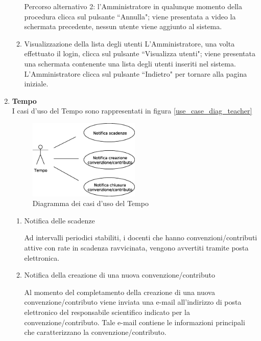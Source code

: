 \begin{enumerate}
\begin{enumerate}
 Percorso alternativo 2:
 l'Amministratore in qualunque momento della procedura clicca sul pulsante ``Annulla"; viene presentata a video la schermata precedente,
 nessun utente viene aggiunto al sistema.
 
 \item Visualizzazione della lista degli utenti \label{UC_view_user_list}
  L'Amministratore, una volta effettuato il login, clicca sul pulsante ``Visualizza utenti"; viene presentata una schermata contenente una lista  degli
  utenti inseriti nel sistema. L'Amministratore clicca sul pulsante ``Indietro" per tornare alla pagina iniziale.
\end{enumerate}

\item \textbf{Tempo}\\
I casi d'uso del Tempo sono rappresentati in figura \ref{use_case_diag_teacher}
\begin{figure}[h]
  \caption{Diagramma dei casi d'uso del Tempo}
  \label{use_case_diag_time}
  \centering
\includegraphics[width = 0.5\textwidth]{images/casi_uso_tempo.eps}
\end{figure}
\begin{enumerate}
 \item Notifica delle scadenze\\ \label{UC_notify_deadlines}
 
    Ad intervalli periodici stabiliti, i docenti che hanno convenzioni/contributi attive con rate in scadenza ravvicinata, vengono avvertiti tramite posta elettronica.
  
 
 \item Notifica della creazione di una nuova convenzione/contributo\\ \label{UC_notify_new_contract}
 
    Al momento del completamento della creazione di una nuova convenzione/contributo viene inviata una e-mail all'indirizzo di posta elettronico del responsabile scientifico indicato per la convenzione/contributo. Tale e-mail contiene
    le informazioni principali che caratterizzano la convenzione/contributo.
  

\end{enumerate}
\end{enumerate}
